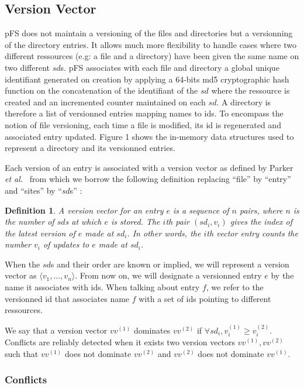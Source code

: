 \documentclass[letterpaper,twocolumn,10pt]{article}
\newtheorem{definition}{Definition}
\begin{document}
\subsection{Version Vector}

pFS does not maintain a versioning of the files and directories but a
versionning of the directory entries. It allows much more flexibility
to handle cases where two different ressources (e.g: a file and a
directory) have been given the same name on two different $sd$s.  pFS
associates with each file and directory a global unique identifiant
generated on creation by applying a 64-bits md5 cryptographic hash
function on the concatenation of the identifiant of the $sd$ where the
ressource is created and an incremented counter maintained on each
$sd$. A directory is therefore a list of versionned entries mapping
names to ids. To encompass the notion of file versioning, each time a
file is modified, its id is regenerated and associated entry
updated. Figure 1 shows the in-memory data structures used to
represent a directory and its versionned entries.

Each version of an entry is associated with a version vector as
defined by Parker \emph{et al.}~\cite{Parker1983} from which we
borrow the following definition replacing ``file'' by ``entry'' and
``sites'' by ``$sd$s'' :

\begin{definition}
A version vector for an entry $e$ is a sequence of $n$ pairs, where
$n$ is the number of $sd$s at which $e$ is stored. The $i$th pair
$(sd_{i}, v_{i})$ gives the index of the latest version of $e$ made at
$sd_{i}$. In other words, the $i$th vector entry counts the number
$v_{i}$ of updates to $e$ made at $sd_{i}$.
\end{definition}

When the $sd$s and their order are known or implied, we will represent a
version vector as $\langle v_{1}, ..., v_{n} \rangle$. From now on, we
will designate a versionned entry $e$ by the name it associates with
ids. When talking about entry $f$, we refer to the versionned id that
associates name $f$ with a set of ids pointing to different
ressources.

We say that a version vector $vv^{(1)}$ dominates $vv^{(2)}$ if
$\forall sd_{i}, v_{i}^{(1)} \geq v_{i}^{(2)}$. Conflicts are reliably
detected when it exists two version vectors $vv^{(1)}, vv^{(2)}$ such
that $vv^{(1)}$ does not dominate $vv^{(2)}$ and $vv^{(2)}$ does not
dominate $vv^{(1)}$. 

\subsubsection{Conflicts}
\end{document}
